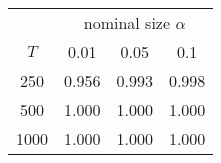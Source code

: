 % 
\begin{tabular}{cccc}
  \hline
  & \multicolumn{3}{c}{nominal size $\alpha$} \\
 $T$ & 0.01 & 0.05 & 0.1 \\
 \hline
250 & 0.956 & 0.993 & 0.998 \\ 
  500 & 1.000 & 1.000 & 1.000 \\ 
  1000 & 1.000 & 1.000 & 1.000 \\ 
   \hline
\end{tabular}
